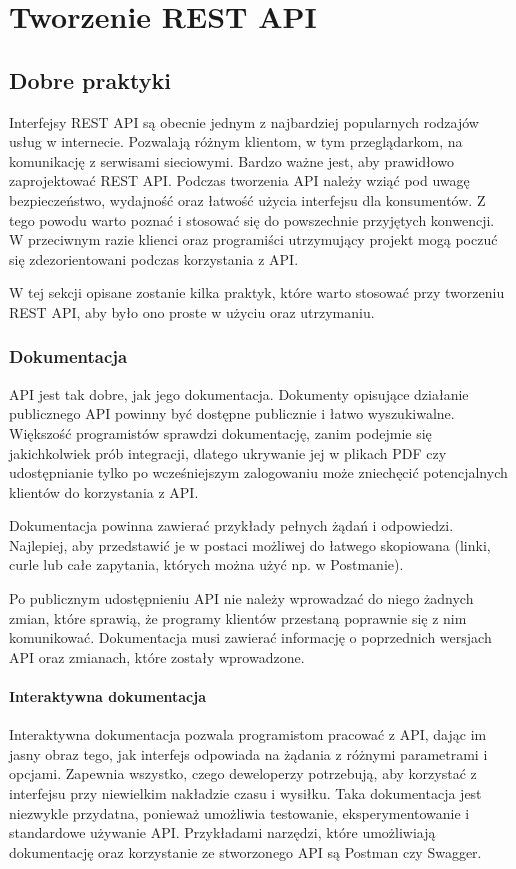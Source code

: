 \chapter{Tworzenie REST API}
\section{Dobre praktyki}
	Interfejsy REST API są obecnie jednym z najbardziej popularnych rodzajów usług w internecie. Pozwalają różnym klientom, w tym przeglądarkom, na komunikację z serwisami sieciowymi. Bardzo ważne jest, aby prawidłowo zaprojektować REST API. Podczas tworzenia API należy wziąć pod uwagę bezpieczeństwo, wydajność oraz łatwość użycia interfejsu dla konsumentów. Z tego powodu warto poznać i stosować się do powszechnie przyjętych konwencji. W przeciwnym razie klienci oraz programiści utrzymujący projekt mogą poczuć się zdezorientowani podczas korzystania z API.
	
	W tej sekcji opisane zostanie kilka praktyk, które warto stosować przy tworzeniu REST API, aby było ono proste w użyciu oraz utrzymaniu.
	
	\subsection{Dokumentacja}
		API jest tak dobre, jak jego dokumentacja. Dokumenty opisujące działanie publicznego API powinny być dostępne publicznie i łatwo wyszukiwalne. Większość programistów sprawdzi dokumentację, zanim podejmie się jakichkolwiek prób integracji, dlatego ukrywanie jej w plikach PDF czy udostępnianie tylko po wcześniejszym zalogowaniu może zniechęcić potencjalnych klientów do korzystania z API.
		
		Dokumentacja powinna zawierać przykłady pełnych żądań i odpowiedzi. Najlepiej, aby przedstawić je w postaci możliwej do łatwego skopiowana (linki, curle lub całe zapytania, których można użyć np. w Postmanie).
		
		Po publicznym udostępnieniu API nie należy wprowadzać do niego żadnych zmian, które sprawią, że programy klientów przestaną poprawnie się z nim komunikować. Dokumentacja musi zawierać informację o poprzednich wersjach API oraz zmianach, które zostały wprowadzone.
		
		\subsubsection{Interaktywna dokumentacja}
		Interaktywna dokumentacja pozwala programistom pracować z API, dając im jasny obraz tego, jak interfejs odpowiada na żądania z różnymi parametrami i opcjami. Zapewnia wszystko, czego deweloperzy potrzebują, aby korzystać z interfejsu przy niewielkim nakładzie czasu i wysiłku. Taka dokumentacja jest niezwykle przydatna, ponieważ umożliwia testowanie, eksperymentowanie i standardowe używanie API. Przykładami narzędzi, które umożliwiają dokumentację oraz korzystanie ze stworzonego API są Postman czy Swagger.
	
